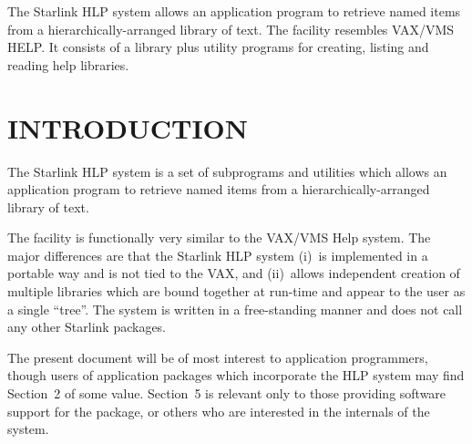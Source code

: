 The Starlink HLP system
allows an application program to retrieve named items from
a hierarchically-arranged library of text.
The facility resembles VAX/VMS HELP.  It consists
of a library plus
utility programs for creating, listing and reading help
libraries.
 \newpage
 \begin{latexonly}
   \setlength{\parskip}{0mm}
   \latexonlytoc
   \setlength{\parskip}{\medskipamount}
   \markright{\stardocname}
 \end{latexonly}
\newpage
\renewcommand{\thepage}{\arabic{page}}
\setcounter{page}{1}

\section{INTRODUCTION}
The Starlink HLP system is a set of subprograms and utilities which
allows an application program to retrieve named items from
a hierarchically-arranged library of text.

The facility is functionally
very similar to the VAX/VMS Help system.  The major differences
are that the Starlink HLP system (i)~is implemented in
a portable way and is not tied to the VAX, and (ii)~allows
independent creation of multiple libraries which
are bound together at run-time and appear to the user as a single
``tree''.  The system is written in a free-standing manner and does not call
any other Starlink packages.

The present document will be of most interest to application programmers,
though users of application packages which incorporate the HLP system
may find Section~2 of some
value.  Section~5 is
relevant only to those providing software support for the package,
or others who are interested in the internals of the system.

